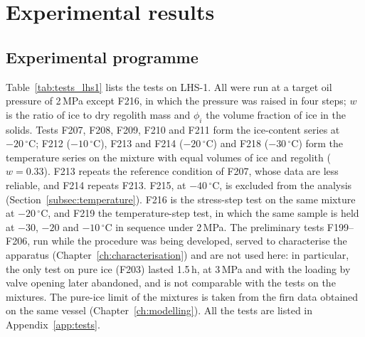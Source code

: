 \chapter{Experimental results}
\label{ch:results}%

\section{Experimental programme}
\label{sec:programme}

Table~\ref{tab:tests_lhs1} lists the tests on LHS-1. All were run at a target oil pressure of 2\,MPa except F216, in which the pressure was raised in four steps; $w$ is the ratio of ice to dry regolith mass and $\phi_i$ the volume fraction of ice in the solids. Tests F207, F208, F209, F210 and F211 form the ice-content series at $-20\,^\circ$C; F212 ($-10\,^\circ$C), F213 and F214 ($-20\,^\circ$C) and F218 ($-30\,^\circ$C) form the temperature series on the mixture with equal volumes of ice and regolith ($w = 0.33$). F213 repeats the reference condition of F207, whose data are less reliable, and F214 repeats F213. F215, at $-40\,^\circ$C, is excluded from the analysis (Section~\ref{subsec:temperature}). F216 is the stress-step test on the same mixture at $-20\,^\circ$C, and F219 the temperature-step test, in which the same sample is held at $-30$, $-20$ and $-10\,^\circ$C in sequence under 2\,MPa. The preliminary tests F199--F206, run while the procedure was being developed, served to characterise the apparatus (Chapter~\ref{ch:characterisation}) and are not used here: in particular, the only test on pure ice (F203) lasted 1.5\,h, at 3\,MPa and with the loading by valve opening later abandoned, and is not comparable with the tests on the mixtures. The pure-ice limit of the mixtures is taken from the firn data obtained on the same vessel (Chapter~\ref{ch:modelling}). All the tests are listed in Appendix~\ref{app:tests}.

